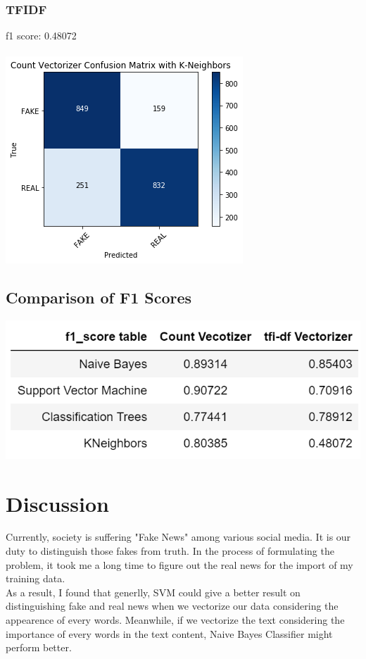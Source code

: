 \documentclass[twoside,twocolumn]{article}
\begin{document}
    \subsubsection{TFIDF}
    f1 score: 0.48072\\
    \\ \noindent \includegraphics[scale=0.6]{figures/knn_tfidf.png}

    \subsection{Comparison of F1 Scores}
    \includegraphics[scale=0.9]{figures/f1.png}
    \section{Discussion}
    Currently, society is suffering "Fake News" among various social media. It is our duty to 
    distinguish those fakes from truth. In the process of formulating the problem, it took me
    a long time to figure out the real news for the import of my training data.
    \\ As a result, I found that generlly, SVM could give a better result on distinguishing fake
    and real news when we vectorize our data considering the appearence of every words. Meanwhile, 
    if we vectorize the text considering the importance of every words in the text content, Naive
    Bayes Classifier might perform better.
\end{document}
